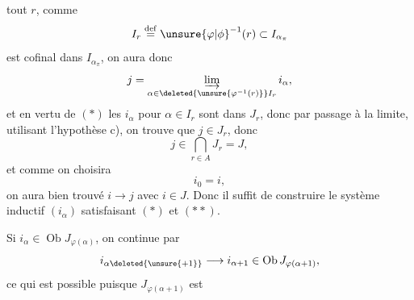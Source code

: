 
 tout $r$, comme
\[
I_r\overset{\mathrm{def}}{=}\unsure{\varphi|\phi}^{-1}(r)\subset I_{\alpha_\pi}
\]
est cofinal dans $I_{\alpha_\pi}$, on aura donc
\[
j=\varinjlim_{\alpha\in\deleted{\unsure{\varphi^{-1}(r)}}I_r}i_\alpha,
\]
et  en vertu de $(*)$ les
$i_\alpha$ pour $\alpha\in I_r$ sont dans $J_r$, donc
par passage à la limite, utilisant
l'hypothèse c), on trouve que $j\in J_r$,
donc 
\[
j\in\bigcap_{r\in A}J_r=J,
\]
et comme on choisira
\[
i_0=i,\tag*{$(**)$}
\]
on aura bien trouvé $i\longrightarrow j$ avec $i\in J$.
Donc il suffit de construire le système
inductif $(i_\alpha)$ satisfaisant $(*)$ et $(**)$. 

Si  $i_\alpha\in\operatorname{Ob}J_{\varphi(\alpha)}$,  on continue
par
\[
i_{\alpha\deleted{\unsure{+1}}}\longrightarrow i_{\alpha+1}\in\operatorname{Ob}J_{\varphi(\alpha+1)},
\]
ce qui est possible puisque $J_{\varphi(\alpha+1)}$ est
